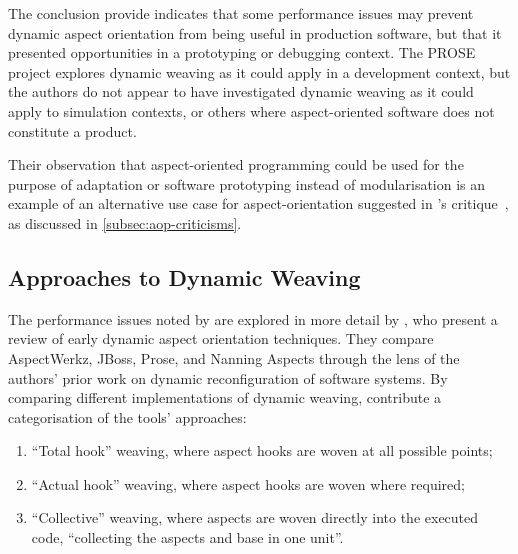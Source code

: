 The conclusion \citet{popovici2003JITaspects} provide indicates that some
performance issues may prevent dynamic aspect orientation from being useful in
production software, but that it presented opportunities in a prototyping or
debugging context. The PROSE project explores dynamic weaving as it could apply
in a development context, but the authors do not appear to have investigated
dynamic weaving as it could apply to simulation contexts, or others where
aspect-oriented software does not constitute a product.

Their observation that aspect-oriented programming could be
used for the purpose of adaptation or software prototyping instead of
modularisation is an example of an alternative use case for aspect-orientation
suggested in \citeauthor{steimann06paradoxical}'s
critique~\cite{steimann06paradoxical}, as discussed in
\cref{subsec:aop-criticisms}.


\subsection{Approaches to Dynamic Weaving}


The performance issues noted by \citeauthor{popovici2003JITaspects} are explored
 in more detail by
\citet{dynamicAOchitchyan}, who present a review of early dynamic aspect
orientation techniques. They compare AspectWerkz, JBoss, Prose, and Nanning
Aspects through the lens of the authors' prior work on dynamic reconfiguration
of software systems. By comparing different implementations of dynamic
weaving, \citeauthor{dynamicAOchitchyan} contribute a categorisation of the tools'
approaches: 

\begin{enumerate}
\item ``Total hook'' weaving, where aspect hooks are woven at all possible
points;
\item ``Actual hook'' weaving, where aspect hooks are woven where required;
\item ``Collective'' weaving, where aspects are woven directly into the executed
code, ``collecting the aspects and base in one unit''.
\end{enumerate}


